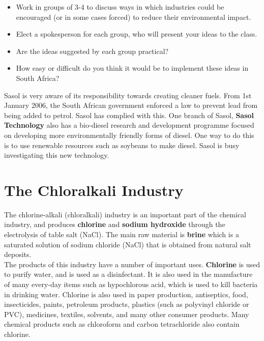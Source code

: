 {\begin{enumerate}
{\begin{itemize}
\item{Work in groups of 3-4 to discuss ways in which industries could be encouraged (or in some cases forced) to reduce their environmental impact.}
\item{Elect a spokesperson for each group, who will present your ideas to the class.}
\item{Are the ideas suggested by each group practical?}
\item{How easy or difficult do you think it would be to implement these ideas in South Africa?}
\end{itemize}}
\end{enumerate}
}

\begin{IFact}{Sasol is very aware of its responsibility towards creating cleaner fuels. From 1st January 2006, the South African government enforced a law to prevent lead from being added to petrol. Sasol has complied with this. One branch of Sasol, \textbf{Sasol Technology} also has a bio-diesel research and development programme focused on developing more environmentally friendly forms of diesel. One way to do this is to use renewable resources such as soybeans to make diesel. Sasol is busy investigating this new technology.
}
\end{IFact}

\section{The Chloralkali Industry}
\label{sec:chemical:chloralkali}

The chlorine-alkali (chloralkali) industry is an important part of the chemical industry, and produces \textbf{chlorine} and \textbf{sodium hydroxide} through the electrolysis of table salt (NaCl). The main raw material is \textbf{brine} which is a saturated solution of sodium chloride (NaCl) that is obtained from natural salt deposits. \\

The products of this industry have a number of important uses. \textbf{Chlorine} is used to purify water, and is used as a disinfectant. It is also used in the manufacture of many every-day items such as hypochlorous acid, which is used to kill bacteria in drinking water. Chlorine is also used in paper production, antiseptics, food, insecticides, paints, petroleum products, plastics (such as polyvinyl chloride or PVC), medicines, textiles, solvents, and many other consumer products. Many chemical products such as chloroform and carbon tetrachloride also contain chlorine.\\

